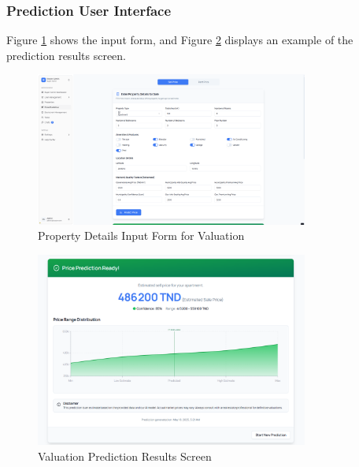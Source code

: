 \newpage

\subsubsection{Prediction User Interface}
Figure \ref{fig:prediction-form} shows the input form, and Figure \ref{fig:prediction-results} displays an example of the prediction results screen.

\begin{figure}[htbp]
        \centering
        \includegraphics[width=0.8\textwidth]{images/screenshot_form_predition.png}
        \caption{Property Details Input Form for Valuation}
        \label{fig:prediction-form}
\end{figure}

\begin{figure}[htbp]
        \centering
        \includegraphics[width=0.8\textwidth]{images/screenshot_predctionscreen.png}
        \caption{Valuation Prediction Results Screen}
        \label{fig:prediction-results}
\end{figure}
\newpage

